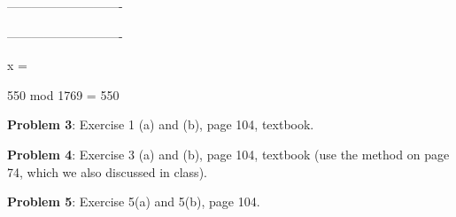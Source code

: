 \documentclass[12pt,letterpaper,final]{report}
\begin{document}
----------------------------


----------------------------

x = 

550 mod 1769 = 550

\bigskip
\noindent\textbf{Problem 3}: Exercise 1 (a) and (b), page 104, textbook.


\bigskip
\noindent\textbf{Problem 4}: Exercise 3 (a) and (b), page 104, textbook (use the method on page 74, which we also discussed in class).


\bigskip
\noindent\textbf{Problem 5}: Exercise 5(a) and 5(b), page 104.
\end{document}
